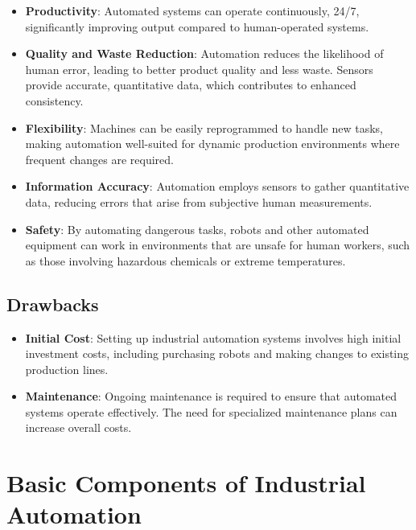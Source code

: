 \documentclass[
  14pt,
  a4paper,
  numbers=noendperiod,
  headinclude=true,
  footinclude=true,
  DIV=calc]{scrreprt}
\providecommand{\tightlist}{%
  \setlength{\itemsep}{0pt}\setlength{\parskip}{0pt}}\usepackage{longtable,booktabs,array}
\begin{document}
\begin{itemize}
\tightlist
\item
  \textbf{Productivity}: Automated systems can operate continuously,
  24/7, significantly improving output compared to human-operated
  systems.
\item
  \textbf{Quality and Waste Reduction}: Automation reduces the
  likelihood of human error, leading to better product quality and less
  waste. Sensors provide accurate, quantitative data, which contributes
  to enhanced consistency.
\item
  \textbf{Flexibility}: Machines can be easily reprogrammed to handle
  new tasks, making automation well-suited for dynamic production
  environments where frequent changes are required.
\item
  \textbf{Information Accuracy}: Automation employs sensors to gather
  quantitative data, reducing errors that arise from subjective human
  measurements.
\item
  \textbf{Safety}: By automating dangerous tasks, robots and other
  automated equipment can work in environments that are unsafe for human
  workers, such as those involving hazardous chemicals or extreme
  temperatures.
\end{itemize}

\subsection{Drawbacks}\label{drawbacks}

\begin{itemize}
\tightlist
\item
  \textbf{Initial Cost}: Setting up industrial automation systems
  involves high initial investment costs, including purchasing robots
  and making changes to existing production lines.
\item
  \textbf{Maintenance}: Ongoing maintenance is required to ensure that
  automated systems operate effectively. The need for specialized
  maintenance plans can increase overall costs.
\end{itemize}

\section{Basic Components of Industrial
Automation}\label{basic-components-of-industrial-automation}
\end{document}

